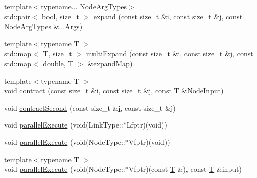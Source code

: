 \begin{DoxyCompactItemize}
\item 
{\footnotesize template$<$typename... Node\+Arg\+Types$>$ }\\std\+::pair$<$ bool, size\+\_\+t $>$ \hyperlink{classmodel_1_1_network_afde7706c6bc0cc4b7dadb2b82a7aa961}{expand} (const size\+\_\+t \&\hyperlink{_cubic_spline_intersection_8m_a6f6ccfcf58b31cb6412107d9d5281426}{i}, const size\+\_\+t \&j, const Node\+Arg\+Types \&...Args)
\item 
{\footnotesize template$<$typename T $>$ }\\std\+::map$<$ \hyperlink{_spline_node_base__corder1_8h_a82692d3a5502b91460591f1d5504314a}{T}, size\+\_\+t $>$ \hyperlink{classmodel_1_1_network_a4d7f02c89ade148bca836fe9d11e0c51}{multi\+Expand} (const size\+\_\+t \&\hyperlink{_cubic_spline_intersection_8m_a6f6ccfcf58b31cb6412107d9d5281426}{i}, const size\+\_\+t \&j, const std\+::map$<$ double, \hyperlink{_spline_node_base__corder1_8h_a82692d3a5502b91460591f1d5504314a}{T} $>$ \&expand\+Map)
\item 
{\footnotesize template$<$typename T $>$ }\\void \hyperlink{classmodel_1_1_network_a1e58a09f1f149d31da75f98a04b53d45}{contract} (const size\+\_\+t \&\hyperlink{_cubic_spline_intersection_8m_a6f6ccfcf58b31cb6412107d9d5281426}{i}, const size\+\_\+t \&j, const \hyperlink{_spline_node_base__corder1_8h_a82692d3a5502b91460591f1d5504314a}{T} \&Node\+Input)
\item 
void \hyperlink{classmodel_1_1_network_a46af74b7b77a8240777d628d5789ebde}{contract\+Second} (const size\+\_\+t \&\hyperlink{_cubic_spline_intersection_8m_a6f6ccfcf58b31cb6412107d9d5281426}{i}, const size\+\_\+t \&j)
\item 
void \hyperlink{classmodel_1_1_network_ade1f0eb0cccfbb43ab43e3839e169079}{parallel\+Execute} (void(Link\+Type\+::$\ast$Lfptr)(void))
\item 
void \hyperlink{classmodel_1_1_network_adb05779de8addb0d084ff027083b4eb5}{parallel\+Execute} (void(Node\+Type\+::$\ast$Vfptr)(void))
\item 
{\footnotesize template$<$typename T $>$ }\\void \hyperlink{classmodel_1_1_network_ab779ecd3614cba7227c4d29534dee8f6}{parallel\+Execute} (void(Node\+Type\+::$\ast$Vfptr)(const \hyperlink{_spline_node_base__corder1_8h_a82692d3a5502b91460591f1d5504314a}{T} \&), const \hyperlink{_spline_node_base__corder1_8h_a82692d3a5502b91460591f1d5504314a}{T} \&input)
\end{DoxyCompactItemize}
